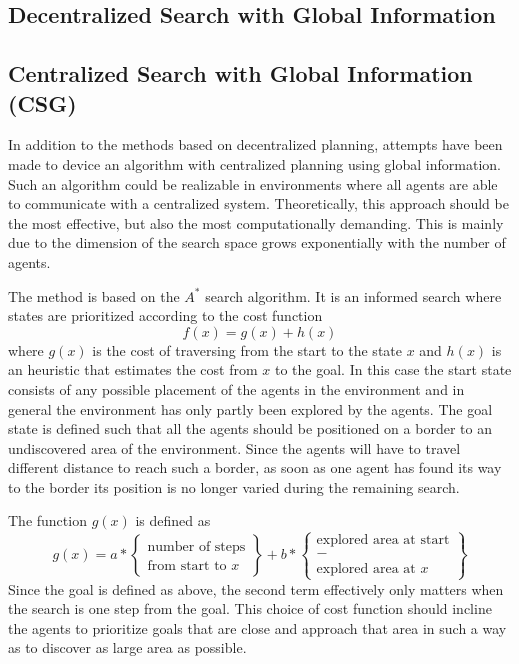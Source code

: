 \documentclass{article}
\begin{document}
\subsection{Decentralized Search with Global Information}

\subsection{Centralized Search with Global Information (CSG)}
In addition to the methods based on decentralized planning, attempts have been
made to device an algorithm with centralized planning using global information.
Such an algorithm could be realizable in environments where all agents are able
to communicate with a centralized system. Theoretically, this approach should
be the most effective, but also the most computationally demanding. This is
mainly due to the dimension of the search space grows exponentially with the
number of agents.

The method is based on the $A^*$ search algorithm. It is an informed search
where states are prioritized according to the cost function
%
$$f(x) = g(x) + h(x)$$
%
where $g(x)$ is the cost of traversing from the start to the state $x$ and
$h(x)$ is an heuristic that estimates the cost from $x$ to the goal. In this
case the start state consists of any possible placement of the agents in the
environment and in general the environment has only partly been explored by the
agents. The goal state is defined such that all the agents should be positioned
on a border to an undiscovered area of the environment. Since the agents will
have to travel different distance to reach such a border, as soon as one agent 
has found its way to the border its position is no longer varied during the 
remaining search.

The function $g(x)$ is defined as
%
$$g(x) = a * \begin{Bmatrix} \text{number of steps} \\ \text{from start to $x$}
\end{Bmatrix} + b * \begin{Bmatrix} \text{explored area at start} \\ - \\ \text{
explored area at $x$} \end{Bmatrix}$$
%
Since the goal is defined as above, the second term effectively only matters
when the search is one step from the goal. This choice of cost function should
incline the agents to prioritize goals that are close and approach that area in
such a way as to discover as large area as possible.
\end{document}
